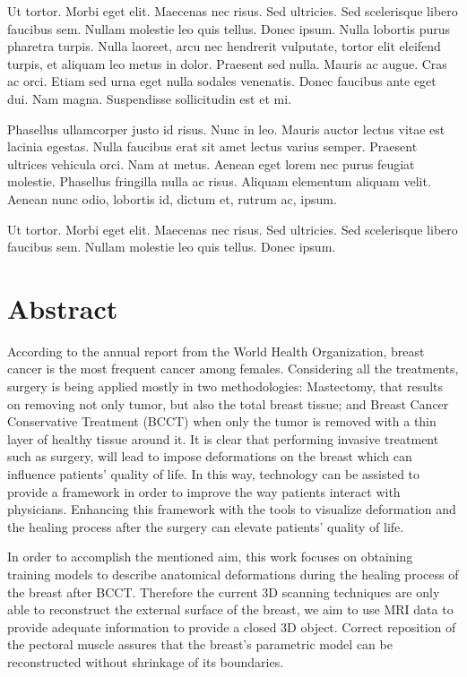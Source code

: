 Ut tortor. Morbi eget elit. Maecenas nec risus. Sed ultricies. Sed
scelerisque libero faucibus sem. Nullam molestie leo quis
tellus. Donec ipsum. Nulla lobortis purus pharetra turpis. Nulla
laoreet, arcu nec hendrerit vulputate, tortor elit eleifend turpis, et
aliquam leo metus in dolor. Praesent sed nulla. Mauris ac augue. Cras
ac orci. Etiam sed urna eget nulla sodales venenatis. Donec faucibus
ante eget dui. Nam magna. Suspendisse sollicitudin est et mi. 

Phasellus ullamcorper justo id risus. Nunc in leo. Mauris auctor
lectus vitae est lacinia egestas. Nulla faucibus erat sit amet lectus
varius semper. Praesent ultrices vehicula orci. Nam at metus. Aenean
eget lorem nec purus feugiat molestie. Phasellus fringilla nulla ac
risus. Aliquam elementum aliquam velit. Aenean nunc odio, lobortis id,
dictum et, rutrum ac, ipsum. 

Ut tortor. Morbi eget elit. Maecenas nec risus. Sed ultricies. Sed
scelerisque libero faucibus sem. Nullam molestie leo quis
tellus. Donec ipsum. 

\chapter*{Abstract}

According to the annual report from the World Health Organization, breast cancer is the most frequent cancer among females. Considering all the treatments, surgery is being applied mostly in two methodologies: Mastectomy, that results on removing not only tumor, but also the total breast tissue; and Breast Cancer Conservative Treatment (BCCT) when only the tumor is removed with a thin layer of healthy tissue around it. It is clear that performing invasive treatment such as surgery, will lead to impose deformations on the breast which can influence patients’ quality of life. In this way, technology can be assisted to provide a framework in order to improve the way patients interact with physicians. Enhancing this framework with the tools to visualize deformation and the healing process after the surgery can elevate patients’ quality of life.


In order to accomplish the mentioned aim, this work focuses on obtaining training models to describe anatomical deformations during the healing process of the breast after BCCT. Therefore the current 3D scanning techniques are only able to reconstruct the external surface of the breast, we aim to use MRI data to provide adequate information to provide a closed 3D object. Correct reposition of the pectoral muscle assures that the breast’s parametric model can be reconstructed without shrinkage of its boundaries.


